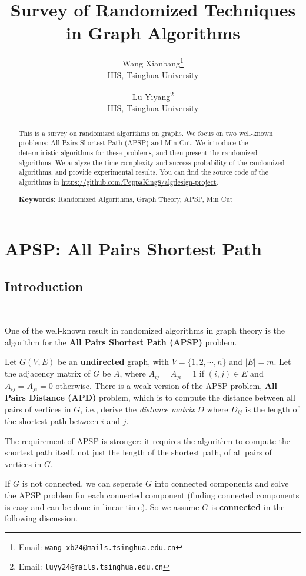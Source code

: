\documentclass[12pt]{article}
\title{Survey of Randomized Techniques in Graph Algorithms}
\author{
    Wang Xianbang\thanks{Email: \texttt{wang-xb24@mails.tsinghua.edu.cn}} \\
    IIIS, Tsinghua University
    \and
    Lu Yiyang\thanks{Email: \texttt{luyy24@mails.tsinghua.edu.cn}} \\
    IIIS, Tsinghua University
}
\begin{document}
\maketitle
\begin{abstract}
    This is a survey on randomized algorithms on graphs. We focus on two well-known problems: All Pairs Shortest Path (APSP) and Min Cut. We introduce the deterministic algorithms for these problems, and then present the randomized algorithms. We analyze the time complexity and success probability of the randomized algorithms, and provide experimental results. You can find the source code of the algorithms in \url{https://github.com/PeppaKing8/algdesign-project}.

    \textbf{Keywords:} Randomized Algorithms, Graph Theory, APSP, Min Cut
\end{abstract}

\tableofcontents

\section{APSP: All Pairs Shortest Path}
\subsection{Introduction}\

One of the well-known result in randomized algorithms in graph theory is the algorithm for the \textbf{All Pairs Shortest Path (APSP)} problem.

Let $G(V,E)$ be an \textbf{undirected} graph, with $V=\{1,2,\cdots,n\}$ and $|E|=m$. Let the adjacency matrix of $G$ be $A$, where $A_{ij}=A_{ji}=1$ if $(i,j)\in E$ and $A_{ij}=A_{ji}=0$ otherwise. There is a weak version of the APSP problem, \textbf{All Pairs Distance (APD)} problem, which is to compute the distance between all pairs of vertices in $G$, i.e., derive the \emph{distance matrix} $D$ where $D_{ij}$ is the length of the shortest path between $i$ and $j$.

The requirement of APSP is stronger: it requires the algorithm to compute the shortest path itself, not just the length of the shortest path, of all pairs of vertices in $G$. 

If $G$ is not connected, we can seperate $G$ into connected components and solve the APSP problem for each connected component (finding connected components is easy and can be done in linear time). So we assume $G$ is \textbf{connected} in the following discussion.
\end{document}
